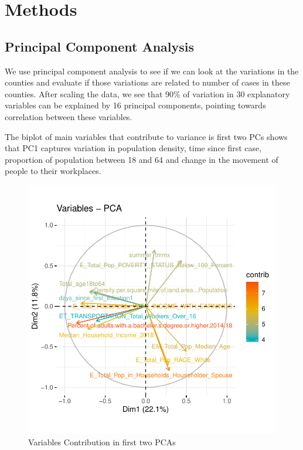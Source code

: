 \documentclass[
]{article}
\begin{document}
\hypertarget{methods}{%
\section{Methods}\label{methods}}

\hypertarget{principal-component-analysis}{%
\subsection{Principal Component
Analysis}\label{principal-component-analysis}}

We use principal component analysis to see if we can look at the
variations in the counties and evaluate if those variations are related
to number of cases in these counties. After scaling the data, we see
that 90\% of variation in 30 explanatory variables can be explained by
16 principal components, pointing towards correlation between these
variables.

The biplot of main variables that contribute to variance is first two
PCs shows that PC1 captures variation in population density, time since
first case, proportion of population between 18 and 64 and change in the
movement of people to their workplaces.

\begin{figure}
\centering
\includegraphics{covid_tree_analysis_files/figure-latex/unnamed-chunk-5-1.pdf}
\caption{Variables Contribution in first two PCAs}
\end{figure}
\end{document}
